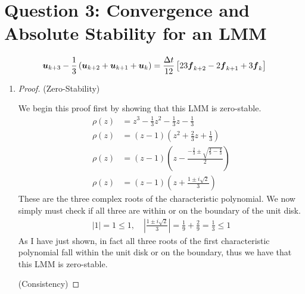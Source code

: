 \documentclass{article}
\begin{document}
\section*{Question 3: Convergence and Absolute Stability for an LMM}

\begin{align}
    \boldsymbol{u}_{k+3} - \frac{1}{3}\left(\boldsymbol{u}_{k+2}+\boldsymbol{u}_{k+1}+\boldsymbol{u}_{k}\right) =
    \frac{\Delta t}{12}\left[23\boldsymbol{f}_{k+2} -2\boldsymbol{f}_{k+1} + 3\boldsymbol{f}_{k}\right]
\end{align}

\begin{enumerate}[label=\alph*)]

    \item 
    \begin{proof}
        (Zero-Stability)

        We begin this proof first by showing that this LMM is zero-stable. 
        \begin{align*}
            \rho(z) &= z^3 - \frac{1}{3}z^2 - \frac{1}{3}z - \frac{1}{3}\\
            \rho(z) &= (z-1)\left(z^2 + \frac{2}{3}z + \frac{1}{3}\right)\\
            \rho(z) &= (z-1)\left(z - \frac{-\frac{2}{3} \pm \sqrt{\frac{4}{9} -
            \frac{4}{3}}}{2}\right)\\
            \rho(z) &= (z-1)\left(z + \frac{1 \pm i\sqrt{2}}{3}\right)
        \end{align*}
        These are the three complex roots of the characteristic polynomial. We
        now simply must check if all three are within or on the boundary of the
        unit disk. 
        \begin{align*}
            |1| = 1 \le 1, \quad \left|\frac{1 \pm i\sqrt{2}}{3}\right| =
            \frac{1}{9} + \frac{2}{9} = \frac{1}{3} \le 1
        \end{align*}
        As I have just shown, in fact all three roots of the first
        characteristic polynomial fall within the unit disk or on the boundary,
        thus we have that this LMM is zero-stable. 

        (Consistency) 


\end{proof}
\end{enumerate}
\end{document}

